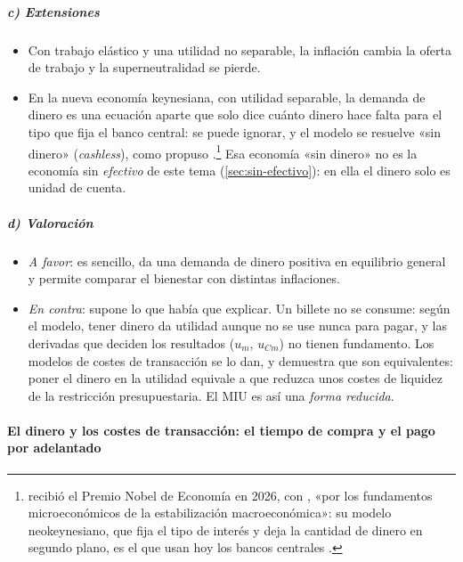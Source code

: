 \documentclass[11pt]{article}
\begin{document}
\subparagraph{c) Extensiones}

\begin{itemize}
\item Con trabajo elástico y una utilidad no separable, la inflación cambia la oferta de trabajo y la superneutralidad se pierde\nocite{Brock1974Money}.
\item En la nueva economía keynesiana, con utilidad separable, la demanda de dinero es una ecuación aparte que solo dice cuánto dinero hace falta para el tipo que fija el banco central: se puede ignorar, y el modelo se resuelve «sin dinero» (\emph{cashless}), como propuso \textcite{Woodford2003Interest}\nocite{Gali2015Monetary} .\footnote{ recibió el Premio Nobel de Economía en 2026, con , «por los fundamentos microeconómicos de la estabilización macroeconómica»\nocite{Nobel2026Prensa}: su modelo neokeynesiano, que fija el tipo de interés y deja la cantidad de dinero en segundo plano, es el que usan hoy los bancos centrales .} Esa economía «sin dinero» no es la economía sin \emph{efectivo} de este tema (\ref{sec:sin-efectivo}): en ella el dinero solo es unidad de cuenta.
\end{itemize}

\subparagraph{d) Valoración}

\begin{itemize}
\item \emph{A favor}: es sencillo, da una demanda de dinero positiva en equilibrio general y permite comparar el bienestar con distintas inflaciones.
\item \emph{En contra}: supone lo que había que explicar\nocite{Hahn1965Problems}. Un billete no se consume: según el modelo, tener dinero da utilidad aunque no se use nunca para pagar, y las derivadas que deciden los resultados ($u_m$, $u_{Cm}$) no tienen fundamento. Los modelos de costes de transacción se lo dan, y \textcite{Feenstra1986Functional} demuestra que son equivalentes: poner el dinero en la utilidad equivale a que reduzca unos costes de liquidez de la restricción presupuestaria. El MIU es así una \emph{forma reducida}.
\end{itemize}

\paragraph{El dinero y los costes de transacción: el tiempo de compra y el pago por adelantado}
\end{document}

